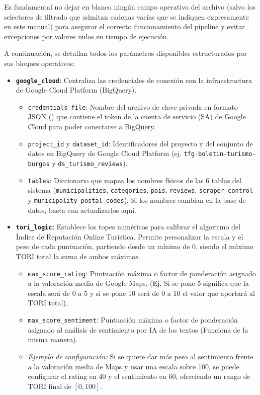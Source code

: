 Es fundamental no dejar en blanco ningún campo operativo del archivo  (salvo los selectores de filtrado que admitan cadenas vacías que se indiquen expresamente en este manual) para asegurar el correcto funcionamiento del pipeline y evitar excepciones por valores nulos en tiempo de ejecución.

A continuación, se detallan todos los parámetros disponibles estructurados por sus bloques operativos:

\begin{itemize}
    \item \textbf{\texttt{google\_cloud}:}
    Centraliza las credenciales de conexión con la infraestructura de Google Cloud Platform (BigQuery).
    \begin{itemize}
        \item \texttt{credentials\_file}: Nombre del archivo de clave privada en formato JSON () que contiene el token de la cuenta de servicio (SA) de Google Cloud para poder conectarse a BigQuery.
        \item \texttt{project\_id} y \texttt{dataset\_id}: Identificadores del proyecto y del conjunto de datos en BigQuery de Google Cloud Platform (ej. \texttt{tfg-boletin-turismo-burgos} y \texttt{ds\_turismo\_reviews}).
        \item \texttt{tables}: Diccionario que mapea los nombres físicos de las 6 tablas del sistema (\texttt{municipalities}, \texttt{categories}, \texttt{pois}, \texttt{reviews}, \texttt{scraper\_control} y \texttt{municipality\_postal\_codes}). Si los nombres cambian en la base de datos, basta con actualizarlos aquí.
    \end{itemize}
    
    \item \textbf{\texttt{tori\_logic}:}
    Establece los topes numéricos para calibrar el algoritmo del Índice de Reputación Online Turística. Permite personalizar la escala y el peso de cada puntuación, partiendo desde un mínimo de 0, siendo el máximo TORI total la suma de ambos máximos.
    \begin{itemize}
        \item \texttt{max\_score\_rating}: Puntuación máxima o factor de ponderación asignado a la valoración media de Google Maps. (Ej. Si se pone 5 significa que la escala será de 0 a 5 y si se pone 10 será de 0 a 10 el valor que aportará al TORI total).
        \item \texttt{max\_score\_sentiment}: Puntuación máxima o factor de ponderación asignado al análisis de sentimiento por IA de los textos (Funciona de la misma manera).
        \item \textit{Ejemplo de configuración:} Si se quiere dar más peso al sentimiento frente a la valoración media de Maps y usar una escala sobre 100, se puede configurar el rating en 40 y el sentimiento en 60, ofreciendo un rango de TORI final de $[0,100]$.
    \end{itemize}
    

\end{itemize}
